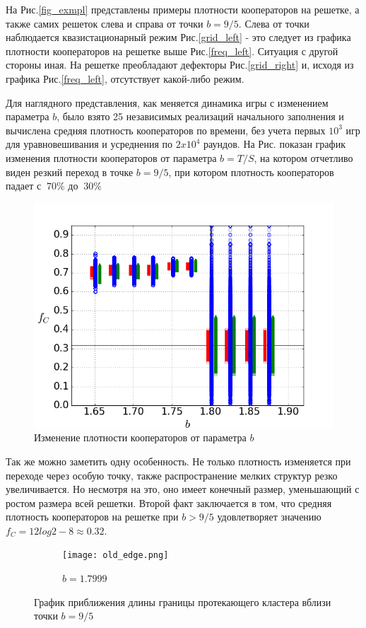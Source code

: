 \documentclass[a4paper]{article}
\begin{document}
	\par На Рис.\ref{fig_exmpl} представлены примеры плотности кооператоров на решетке, а также самих решеток слева и справа от точки $b=9/5$. Слева от точки наблюдается квазистационарный режим Рис.\ref{grid_left} - это следует из графика плотности кооператоров на решетке выше Рис.\ref{freq_left}. Ситуация с другой стороны иная. На решетке преобладают дефекторы Рис.\ref{grid_right} и, исходя из графика Рис.\ref{freq_left}, отсутствует какой-либо режим.
		
	\par Для наглядного представления, как меняется динамика игры с изменением параметра $b$, было взято 25 независимых реализаций начального заполнения и вычислена средняя плотность кооператоров по времени, без учета первых $10^{3}$ игр для уравновешивания и усреднения по $2 x 10^{4}$ раундов. На Рис. показан график изменения плотности кооператоров от параметра $b=T/S$, на котором отчетливо виден резкий переход в точке $b=9/5$, при котором плотность кооператоров падает с $~70\% $ до $~30\%$
	
	\begin{figure}[H]
		\label{freq}
		\centering
		\includegraphics[width=0.7\linewidth]{fig1_1.png}
		\caption{Изменение плотности кооператоров от параметра $b$}
	\end{figure}
	
	
	\par Так же можно заметить одну особенность. Не только плотность изменяется при  переходе через особую точку, также распространение мелких структур резко увеличивается. Но несмотря на это, оно имеет конечный размер, уменьшающий с ростом размера всей решетки. Второй факт заключается в том, что средняя плотность кооператоров на решетке при $b>9/5$ удовлетворяет значению $ f_{C} = 12log2-8 \approx 0.32$.
	
	\begin{figure}
			\begin{subfigure}{.6\textwidth}
			\texttt{[image: old\_edge.png]}
			\caption{$b=1.7999$}
		\end{subfigure}
		\caption{График приближения длины границы протекающего кластера вблизи точки $b=9/5$}
		\label{old_edge}
	\end{figure}
		
\end{document}
